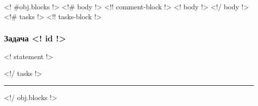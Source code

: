 \documentclass{article}
\begin{document}
    <! #obj.blocks !>
        <!# body !>     <!! comment-block !>
            <!{ body }!>
        <!/ body !>
        <!# tasks !>    <!! tasks-block !>
            \subsubsection*{Задача \textnumero <! id !>}
            <!{ statement }!>

        <!/ tasks !>
        
        \noindent\rule{\textwidth}{0.2pt}
    <!/ obj.blocks !>
\end{document}
